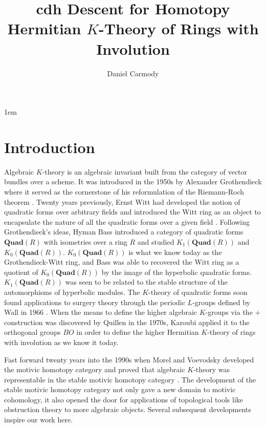 \documentclass[edeposit,fullpage]{uiucthesis2009}
\title{cdh Descent for Homotopy Hermitian $K$-Theory of Rings with Involution}
\author{Daniel Carmody}
\newcommand{\Quad}{\mathbf{Quad}}
\theoremstyle{plain}
\numberwithin{lemma}{section}
\theoremstyle{definition}
\begin{document}
\maketitle

\parindent 1em%

\frontmatter

\tableofcontents

\mainmatter

\chapter{Introduction}

Algebraic $K$-theory is an algebraic invariant built from the category of vector bundles over a scheme. It was introduced in the 1950s by Alexander
Grothendieck where it served as the cornerstone of his reformulation
of the Riemann-Roch theorem \cite{Gro57}.  Twenty years previously, Ernst Witt had
developed the notion of quadratic forms over arbitrary fields and
introduced the Witt ring as an object to encapsulate the nature of
all the quadratic forms over a given field \cite{Witt1937}. Following
Grothendieck's ideas, Hyman Bass introduced a category of quadratic
forms  $\Quad(R)$
with isometries over a ring $R$ and studied $K_1(\Quad(R))$ and $K_0(\Quad(R))$. $K_0(\Quad(R))$ is what we know today as the
Grothendieck-Witt ring, and Bass was able to recovered the Witt ring
as a quotient of $K_0(\Quad(R))$ by the image of the hyperbolic
quadratic forms. $K_1(\Quad(R))$ was seen to be related to the stable
structure of the automorphisms of hyperbolic modules. The $K$-theory
of quadratic forms soon found applications to surgery theory through
the periodic $L$-groups defined by Wall in 1966 \cite{Wall66}. When
the means to define the higher algebraic $K$-groups via the $+$ construction was discovered by
Quillen in the 1970s, Karoubi applied it to the orthogonal groups $BO$
in order to define the higher Hermitian $K$-theory of rings with
involution as we know it today\cite{Kar73}.

Fast forward twenty years into the 1990s when Morel and Voevodsky
developed the motivic homotopy category and proved that algebraic
$K$-theory was representable in the stable motivic homotopy category
\cite{MorelVoev}. The development of the stable motivic homotopy
category not only gave a new domain to motivic cohomology, it also
opened the door for applications of topological tools like obstruction
theory to
more algebraic objects. Several
subsequent developments inspire our work here.
\end{document}
